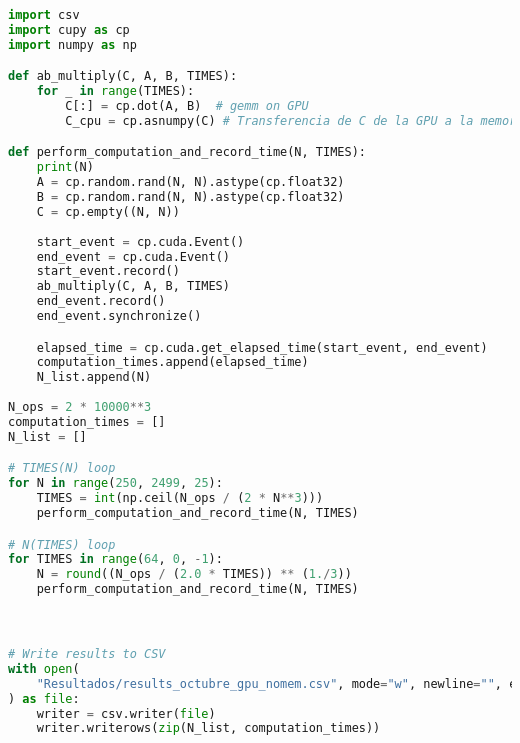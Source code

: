 \begin{lstlisting}[language=Python]
import csv
import cupy as cp
import numpy as np

def ab_multiply(C, A, B, TIMES):
    for _ in range(TIMES):
        C[:] = cp.dot(A, B)  # gemm on GPU
        C_cpu = cp.asnumpy(C) # Transferencia de C de la GPU a la memoria principal

def perform_computation_and_record_time(N, TIMES):
    print(N)
    A = cp.random.rand(N, N).astype(cp.float32)
    B = cp.random.rand(N, N).astype(cp.float32)
    C = cp.empty((N, N))
    
    start_event = cp.cuda.Event()
    end_event = cp.cuda.Event()
    start_event.record()
    ab_multiply(C, A, B, TIMES)
    end_event.record()
    end_event.synchronize()

    elapsed_time = cp.cuda.get_elapsed_time(start_event, end_event)
    computation_times.append(elapsed_time)
    N_list.append(N)
   
N_ops = 2 * 10000**3
computation_times = []
N_list = []

# TIMES(N) loop
for N in range(250, 2499, 25):
    TIMES = int(np.ceil(N_ops / (2 * N**3)))
    perform_computation_and_record_time(N, TIMES)

# N(TIMES) loop
for TIMES in range(64, 0, -1):
    N = round((N_ops / (2.0 * TIMES)) ** (1./3))
    perform_computation_and_record_time(N, TIMES)



# Write results to CSV
with open(
    "Resultados/results_octubre_gpu_nomem.csv", mode="w", newline="", encoding="utf-8"
) as file:
    writer = csv.writer(file)
    writer.writerows(zip(N_list, computation_times))
\end{lstlisting}